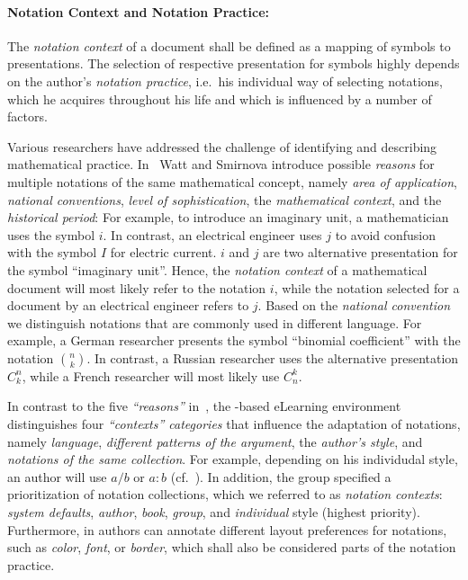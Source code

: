 \documentclass[a4paper]{article}
\begin{document}
\paragraph{Notation Context and Notation Practice:}
The {\emph{notation context}} of a document shall be defined as a mapping of symbols to
presentations. The selection of respective presentation for symbols highly depends on the
author's {\emph{notation practice}}, i.e.\ his individual way of selecting notations,
which he acquires throughout his life and which is influenced by a number of factors.

Various researchers have addressed the challenge of identifying and describing
mathematical practice. In~\cite{ESmStW:Notation} Watt and Smirnova introduce possible
{\emph{reasons}} for multiple notations of the same mathematical concept, namely
{\emph{area of application}}, {\emph{national conventions}}, {\emph{level of
    sophistication}}, the \textit{mathematical context}, and the {\emph{historical
    period}}: For example, to introduce an imaginary unit, a mathematician uses the symbol
$i$. In contrast, an electrical engineer uses $j$ to avoid confusion with the symbol $I$
for electric current. $i$ and $j$ are two alternative presentation for the symbol
``imaginary unit''. Hence, the {\emph{notation context}} of a mathematical document will
most likely refer to the notation $i$, while the notation selected for a document by an
electrical engineer refers to $j$. Based on the {\emph{national convention}} we
distinguish notations that are commonly used in different language. For example, a German
researcher presents the symbol ``binomial coefficient'' with the notation ${n \choose
  k}$. In contrast, a Russian researcher uses the alternative presentation $C_{k}^n$,
while a French researcher will most likely use $C_{n}^k$.

In contrast to the five {\emph{``reasons''}} in~\cite{ESmStW:Notation}, the {\omdoc}-based
eLearning environment {\activemath}~\cite{ManLib:apo05} distinguishes four
{\emph{``contexts'' categories}} that influence the adaptation of notations, namely
{\emph{language}}, {\emph{different patterns of the argument}}, the {\emph{author's
    style}}, and {\emph{notations of the same collection}}. For example, depending on his
individudal style, an author will use $a/b$ or $a:b$ (cf.~\cite{ManLib:apo05}). In
addition, the {\activemath} group specified a prioritization of notation collections,
which we referred to as {\emph{notation contexts}}: {\emph{system defaults}},
{\emph{author}}, {\emph{book}}, {\emph{group}}, and {\emph{individual}} style (highest
priority). Furthermore, in {\activemath} authors can annotate different layout preferences
for notations, such as {\emph{color}}, {\emph{font}}, or {\emph{border}}, which shall also
be considered parts of the notation practice.
\end{document}
